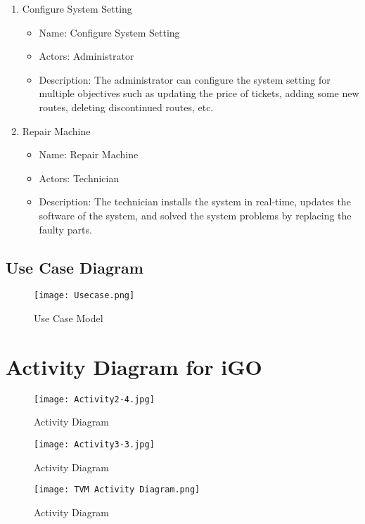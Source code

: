 \documentclass[a4paper,12pt]{report}
\begin{document}
\begin{enumerate}
        \item Configure System Setting
        \begin{itemize}
            \item Name: Configure System Setting
            \item Actors: Administrator
            \item Description: The administrator can configure the system setting for multiple objectives such as updating the price of tickets, adding some new routes, deleting discontinued routes, etc.

            
        \end{itemize}
        
        \item Repair Machine

        \begin{itemize}
            \item Name: Repair Machine
            \item Actors: Technician
            \item Description: The technician installs the system in real-time, updates the software of the system, and solved the system problems by replacing the faulty parts.
        \end{itemize}
        
\end{enumerate}
\newpage
\section{Use Case Diagram}
\begin{figure}[h!]
  \centering
   \texttt{[image: Usecase.png]}
  \caption{Use Case Model}
\end{figure}
\chapter{Activity Diagram for iGO}
 \begin{figure}[h!]
   \centering
   \texttt{[image: Activity2-4.jpg]}
   \caption{Activity Diagram}
 \end{figure}

 \begin{figure}[h!]
   \centering
    \texttt{[image: Activity3-3.jpg]}
   \caption{Activity Diagram}
 \end{figure}
 \begin{figure}[h!]
   \centering
    \texttt{[image: TVM Activity Diagram.png]}
   \caption{Activity Diagram}
 \end{figure}
\end{document}
